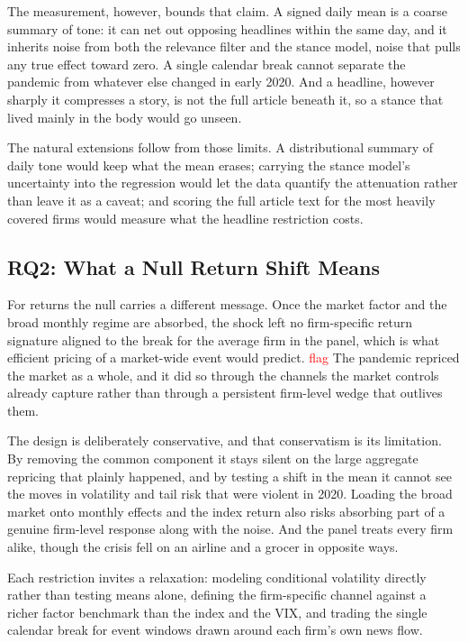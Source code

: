 \documentclass[conference]{IEEEtran}
\begin{document}
The measurement, however, bounds that claim. A signed daily mean is a coarse summary
of tone: it can net out opposing headlines within the same day, and it inherits noise
from both the relevance filter and the stance model, noise that pulls any true effect
toward zero. A single calendar break cannot separate the pandemic from whatever else
changed in early 2020. And a headline, however sharply it compresses a story, is not
the full article beneath it, so a stance that lived mainly in the body would go unseen.

The natural extensions follow from those limits. A distributional summary of daily
tone would keep what the mean erases; carrying the stance model's uncertainty into the
regression would let the data quantify the attenuation rather than leave it as a
caveat; and scoring the full article text for the most heavily covered firms would
measure what the headline restriction costs.

\subsection{RQ2: What a Null Return Shift Means}
For returns the null carries a different message. Once the market factor and the broad
monthly regime are absorbed, the shock left no firm-specific return signature aligned
to the break for the average firm in the panel, which is what efficient pricing of a
market-wide event would predict. 
\textcolor{red}{flag}
The pandemic repriced the market as a whole, and it
did so through the channels the market controls already capture rather than through a
persistent firm-level wedge that outlives them.

The design is deliberately conservative, and that conservatism is its limitation. By
removing the common component it stays silent on the large aggregate repricing that
plainly happened, and by testing a shift in the mean it cannot see the moves in
volatility and tail risk that were violent in 2020. Loading the broad market onto
monthly effects and the index return also risks absorbing part of a genuine
firm-level response along with the noise. And the panel treats every firm alike,
though the crisis fell on an airline and a grocer in opposite ways.

Each restriction invites a relaxation: modeling conditional volatility directly rather
than testing means alone, defining the firm-specific channel against a richer factor
benchmark than the index and the VIX, and trading the single calendar break for event
windows drawn around each firm's own news flow.
\end{document}
